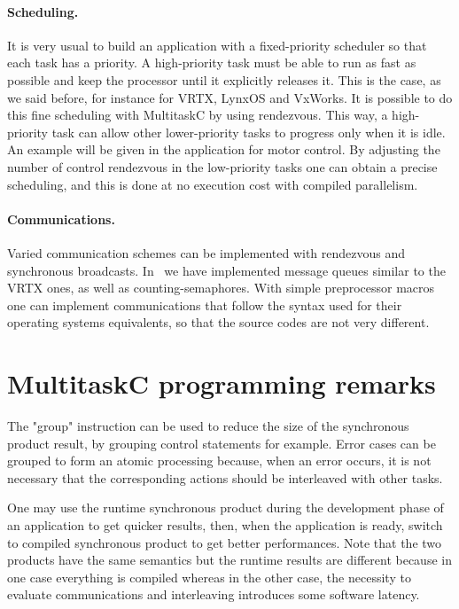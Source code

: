 \documentclass[10pt]{report}
\begin{document}
\paragraph{Scheduling.} It is very usual to build an application with a fixed-priority scheduler
so that each task has a priority. A high-priority task must be able to run as fast as possible and keep 
the processor until it explicitly releases it. This is the case, as we said before, for instance for VRTX, 
LynxOS and VxWorks. It is possible to do this fine scheduling with MultitaskC by using rendezvous. 
This way, a high-priority task can allow other lower-priority tasks to progress only when it is idle. An
example will be given in the application for motor control. By adjusting the number of control rendezvous in 
the low-priority tasks one can obtain a precise scheduling, and this is done at no execution cost with 
compiled parallelism.

\paragraph{Communications.} Varied communication schemes can be implemented with rendezvous and synchronous broadcasts. 
In~\cite{Delchini:95} we have implemented message queues similar to the VRTX ones, as well as counting-semaphores. 
With simple preprocessor macros one can implement communications that follow the syntax used for their operating systems 
equivalents, so that the source codes are not very different.

\section{MultitaskC programming remarks}

The "group" instruction can be used to reduce the size of the synchronous product result, by grouping control
statements for example. Error cases can be grouped to form an atomic processing because, when an error
occurs, it is not necessary that the corresponding actions should be interleaved with other tasks.

One may use the runtime synchronous product during the development phase of an application to get quicker results, 
then, when the application is ready, switch to compiled synchronous product to get better performances. 
Note that the two products have the same semantics but the runtime results are different because in one case everything 
is compiled whereas in the other case, the necessity to evaluate communications and interleaving introduces some software latency.
\end{document}
